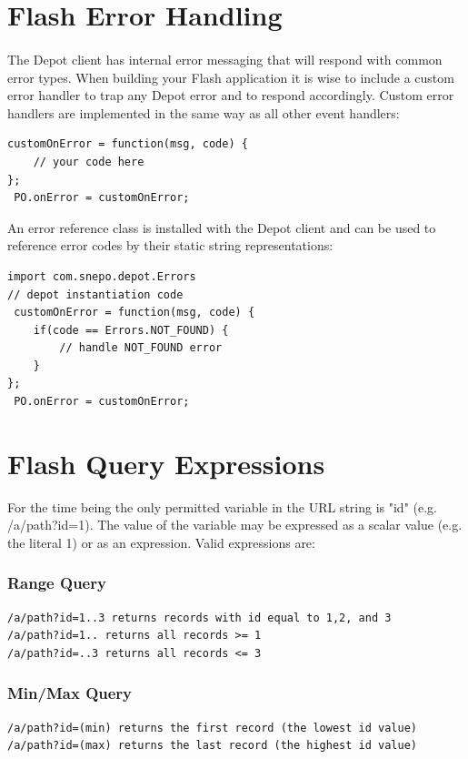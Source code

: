 \documentclass{report}
\begin{document}
\section{Flash Error Handling}
\paragraph{}
The Depot client has internal error messaging that will respond with common error types. When building your Flash application it is wise to include a custom error handler to trap any Depot error and to respond accordingly. Custom error handlers are implemented in the same way as all other event handlers:

\begin{Verbatim}[frame=single]
 customOnError = function(msg, code) {
	// your code here
};
 PO.onError = customOnError;
\end{Verbatim}

An error reference class is installed with the Depot client and can be used to reference error codes by their static string representations:

\begin{Verbatim}[frame=single]
import com.snepo.depot.Errors
// depot instantiation code
 customOnError = function(msg, code) {
	if(code == Errors.NOT_FOUND) {
		// handle NOT_FOUND error
	}
};
 PO.onError = customOnError;
\end{Verbatim}




\section{Flash Query Expressions}
For the time being the only permitted variable in the URL string is
"id" (e.g. /a/path?id=1). The value of the variable may be expressed
as a scalar value (e.g. the literal 1) or as an expression. Valid
expressions are:

\subsubsection{Range Query}
\begin{Verbatim}[frame=single]
/a/path?id=1..3 returns records with id equal to 1,2, and 3 
/a/path?id=1.. returns all records >= 1 
/a/path?id=..3 returns all records <= 3 
\end{Verbatim}
\subsubsection{Min/Max Query}
\begin{Verbatim}[frame=single]
/a/path?id=(min) returns the first record (the lowest id value) 
/a/path?id=(max) returns the last record (the highest id value) 
\end{Verbatim}
\end{document}
